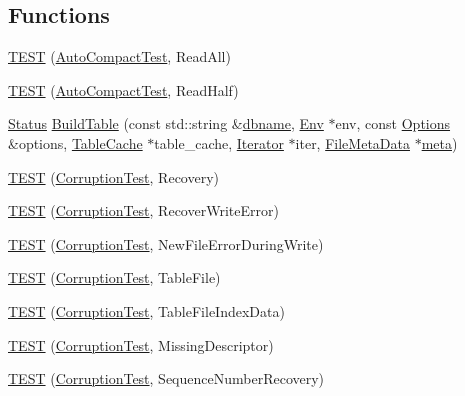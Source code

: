 \subsection*{Functions}
\begin{DoxyCompactItemize}
\item 
\hyperlink{namespaceleveldb_a9c4f7d5038dfc2985100b60ae2549fde}{T\-E\-S\-T} (\hyperlink{classleveldb_1_1_auto_compact_test}{Auto\-Compact\-Test}, Read\-All)
\item 
\hyperlink{namespaceleveldb_a404a4db88f6b45942b1945a996858a62}{T\-E\-S\-T} (\hyperlink{classleveldb_1_1_auto_compact_test}{Auto\-Compact\-Test}, Read\-Half)
\item 
\hyperlink{classleveldb_1_1_status}{Status} \hyperlink{namespaceleveldb_a10e102da98819e1a1f9b254241482e65}{Build\-Table} (const std\-::string \&\hyperlink{c__test_8c_a75d845559336df6843f3b599960f89d2}{dbname}, \hyperlink{classleveldb_1_1_env}{Env} $\ast$env, const \hyperlink{structleveldb_1_1_options}{Options} \&options, \hyperlink{classleveldb_1_1_table_cache}{Table\-Cache} $\ast$table\-\_\-cache, \hyperlink{classleveldb_1_1_iterator}{Iterator} $\ast$iter, \hyperlink{structleveldb_1_1_file_meta_data}{File\-Meta\-Data} $\ast$\hyperlink{repair_8cc_a6b8f1f5fc8f36aa1678fff8fa5aecd0b}{meta})
\item 
\hyperlink{namespaceleveldb_a46326658ffc04dd7509c4066082edb1f}{T\-E\-S\-T} (\hyperlink{classleveldb_1_1_corruption_test}{Corruption\-Test}, Recovery)
\item 
\hyperlink{namespaceleveldb_a22ecc0fbc7435947076320655c5e0265}{T\-E\-S\-T} (\hyperlink{classleveldb_1_1_corruption_test}{Corruption\-Test}, Recover\-Write\-Error)
\item 
\hyperlink{namespaceleveldb_a25dbda5a48ec782778d331e4ccb81b6b}{T\-E\-S\-T} (\hyperlink{classleveldb_1_1_corruption_test}{Corruption\-Test}, New\-File\-Error\-During\-Write)
\item 
\hyperlink{namespaceleveldb_a1da99cee14629599882010198aabfa2a}{T\-E\-S\-T} (\hyperlink{classleveldb_1_1_corruption_test}{Corruption\-Test}, Table\-File)
\item 
\hyperlink{namespaceleveldb_acdfa0365a941e8e01531a402e53ad325}{T\-E\-S\-T} (\hyperlink{classleveldb_1_1_corruption_test}{Corruption\-Test}, Table\-File\-Index\-Data)
\item 
\hyperlink{namespaceleveldb_a6214e0d0ebfaf716601f7a9571aa09ca}{T\-E\-S\-T} (\hyperlink{classleveldb_1_1_corruption_test}{Corruption\-Test}, Missing\-Descriptor)
\item 
\hyperlink{namespaceleveldb_acc1b0ed2e8e9e4e6b930a1727d9fe0f8}{T\-E\-S\-T} (\hyperlink{classleveldb_1_1_corruption_test}{Corruption\-Test}, Sequence\-Number\-Recovery)

\end{DoxyCompactItemize}

